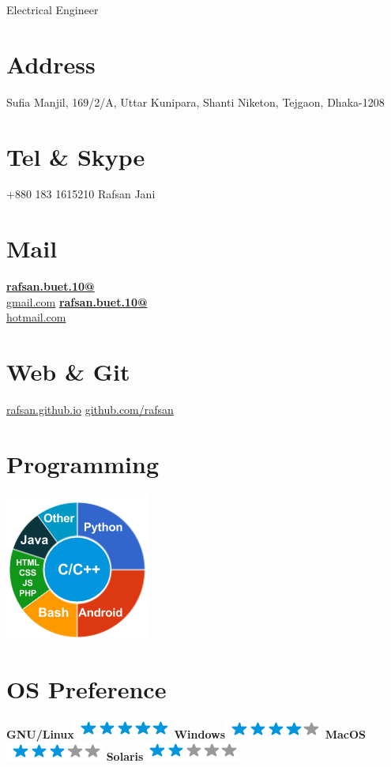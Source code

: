 \documentclass[]{friggeri-cv}
\begin{document}
      {Electrical Engineer}
      

\begin{aside}
  \section{Address}
   Sufia Manjil, 169/2/A, Uttar Kunipara, 
   Shanti Niketon, Tejgaon, Dhaka-1208
    ~
  \section{Tel \& Skype}
    +880 183 1615210
    Rafsan Jani
    ~
  \section{Mail}
    \href{mailto:rafsan.buet.10@gmail.com}{\textbf{rafsan.buet.10@}\\gmail.com}
    \href{mailto:rafsan.buet.10@hotmail.com}{\textbf{rafsan.buet.10@}\\hotmail.com}
    ~
  \section{Web \& Git}
    \href{https://rafsanjanichowdhury.github.io}{rafsan.github.io}
    \href{https://github.com/rafsanjanichowdhury}{github.com/rafsan}
    ~
  \section{Programming}
    \includegraphics[scale=0.62]{img/programming.png}
    ~
  \section{OS Preference}
    \textbf{GNU/Linux}\includegraphics[scale=0.40]{img/5stars.png}
    \textbf{Windows}\includegraphics[scale=0.40]{img/4stars.png}
    \textbf{MacOS}\includegraphics[scale=0.40]{img/3stars.png}
    \textbf{Solaris}\includegraphics[scale=0.40]{img/2stars.png}
    ~

\end{aside}
\end{document}
